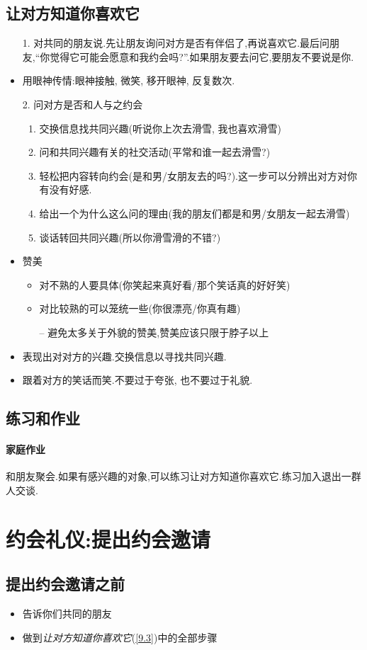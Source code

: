 \documentclass[UTF8]{article}
\newcommand{\Exer}{\subsection{练习和作业}}
\newcommand{\exer}{\paragraph*{家庭作业}}
\newcommand{\dash}{–}
\begin{document}
\subsection{让对方知道你喜欢它\label{9.3}}
\begin{itemize}
    \item[1.] 对共同的朋友说.先让朋友询问对方是否有伴侣了,再说喜欢它.最后问朋友,``你觉得它可能会愿意和我约会吗?''.如果朋友要去问它,要朋友不要说是你.
    \item 用眼神传情:眼神接触, 微笑, 移开眼神, 反复数次.
    \item[2.] 问对方是否和人与之约会
    \begin{enumerate}[label=(\arabic*)]
        \item 交换信息找共同兴趣(听说你上次去滑雪, 我也喜欢滑雪)
        \item 问和共同兴趣有关的社交活动(平常和谁一起去滑雪?)
        \item 轻松把内容转向约会(是和男/女朋友去的吗?).这一步可以分辨出对方对你有没有好感.
        \item 给出一个为什么这么问的理由(我的朋友们都是和男/女朋友一起去滑雪)
        \item 谈话转回共同兴趣(所以你滑雪滑的不错?)
    \end{enumerate}
    \item 赞美\begin{itemize}[label=*]
        \item 对不熟的人要具体(你笑起来真好看/那个笑话真的好好笑)
        \item 对比较熟的可以笼统一些(你很漂亮/你真有趣)
        \item[\dash] 避免太多关于外貌的赞美,赞美应该只限于脖子以上
    \end{itemize}
    \item 表现出对对方的兴趣.交换信息以寻找共同兴趣.
    \item 跟着对方的笑话而笑.不要过于夸张, 也不要过于礼貌.
\end{itemize}
\Exer \exer 和朋友聚会.如果有感兴趣的对象,可以练习让对方知道你喜欢它.练习加入退出一群人交谈.

\newpage
\section{约会礼仪:提出约会邀请}

\subsection{提出约会邀请之前}
\begin{itemize}
    \item 告诉你们共同的朋友
    \item 做到\emph{让对方知道你喜欢它}(\ref{9.3})中的全部步骤
\end{itemize}
\end{document}
